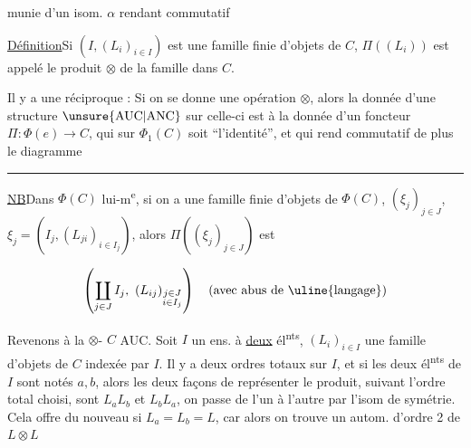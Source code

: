 
munie d'un isom. $\alpha$ rendant commutatif


\uline{Définition}\quad Si $(I,(L_i)_{i\in I})$ est une famille finie d'objets de $C$, $\Pi((L_i))$ est appelé le produit $\otimes$ de la famille dans $C$.

Il y a une réciproque : Si on se donne    une opération $\otimes$, alors la donnée d'une structure $\unsure{\mathrm{AUC}|\mathrm{ANC}}$ sur celle-ci est  à la donnée d'un foncteur $\Pi:\Phi(e)\to C$,  qui sur $\Phi_1(C)$ soit ``l'identité'', et  qui  rend commutatif de plus le diagramme


\rule{2.3em}{1.4pt}

\uline{NB}\quad Dans $\Phi(C)$ lui-m\textsuperscript{e}, si on a une famille finie d'objets de $\Phi(C)$, $(\xi_j)_{j\in J}$, $\xi_j=(I_j,(L_{ji})_{i\in I_j})$, alors $\Pi((\xi_j)_{j\in J})$ est

\[\left(\coprod_{j\in J}I_j,\ (L_{ij})_{\substack{j\in J\\i\in I_j}}\right)\quad\text{(avec abus de \uline{langage})}\]

Revenons à la $\otimes$- $C$ AUC. Soit $I$ un ens.  à \uline{deux} él\textsuperscript{nts}, $(L_i)_{i\in I}$ une famille d'objets de $C$ indexée par $I$. Il y a deux ordres totaux sur $I$, et si les deux él\textsuperscript{nts} de $I$ sont notés $a,b$, alors les deux façons de représenter le produit, suivant l'ordre total choisi, sont $L_a L_b$ et $L_b L_a$, on passe de l'un à l'autre par l'isom de symétrie. Cela offre  du nouveau si $L_a=L_b=L$, car alors on trouve un  autom. d'ordre 2 de $L\otimes L$ 

